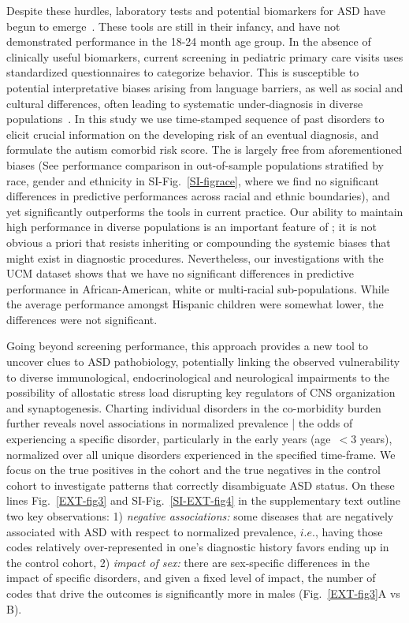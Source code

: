 \documentclass[onecolumn,10pt]{IEEEtran}
\begin{document}
Despite these hurdles, laboratory tests and potential biomarkers for ASD have begun to emerge~\cite{smith2020metabolomics,howsmon2017classification,hicks2018validation}. These tools are still in their infancy, and have not demonstrated performance in the 18-24 month age group. In the absence of clinically useful biomarkers,  current screening in pediatric primary care visits uses standardized  questionnaires to categorize behavior. This is  susceptible to potential interpretative biases arising from language barriers, as well as social and cultural differences, often leading to systematic under-diagnosis in diverse populations~\cite{hyman2020identification}. In this study we use  time-stamped sequence of past  disorders  to elicit crucial information on the developing risk of an eventual  diagnosis, and formulate the autism comorbid risk score. {\HCOL  The \acor is largely free from aforementioned  biases (See performance comparison in out-of-sample populations stratified by race, gender and ethnicity in SI-Fig.~\ref{SI-figrace}, where we find no significant differences in predictive performances across racial and ethnic boundaries), and yet significantly outperforms the tools in current practice. Our ability to maintain high performance in diverse populations is an important feature of \acor; it is not obvious a priori that \acor resists  inheriting or compounding the systemic biases that might exist in diagnostic procedures.  Nevertheless, our investigations with the UCM dataset shows that we have no significant differences in predictive performance in  African-American, white or multi-racial sub-populations. While the average performance amongst Hispanic children were somewhat lower, the differences  were not significant. }

Going beyond screening performance, this approach provides a new tool to uncover clues to ASD pathobiology, potentially linking  the observed vulnerability to  diverse immunological, endocrinological  and neurological impairments to the possibility of allostatic  stress load  disrupting key regulators of  CNS  organization and  synaptogenesis. Charting individual disorders in the co-morbidity burden further reveals novel associations in normalized prevalence | the odds of experiencing a specific disorder, particularly in the early years (age~$<3$ years), normalized over all unique disorders experienced in the specified time-frame. We focus on  the true positives in the \treatment cohort and the true negatives in the control cohort to investigate  patterns that correctly disambiguate  ASD status. On these lines  Fig.~\ref{EXT-fig3} and SI-Fig.~\ref{SI-EXT-fig4}  in the supplementary text outline two key  observations: 1) \textit{negative associations:} some  diseases that are negatively associated with ASD  with respect to normalized prevalence, $i.e.$, having those codes relatively  over-represented  in one's diagnostic history favors ending up in the control cohort, 2) \textit{impact of sex:} there are sex-specific differences in the impact of specific disorders,  and given a fixed level of impact, the number of codes that drive the outcomes is significantly more in males (Fig.~\ref{EXT-fig3}A vs B).
\end{document}
